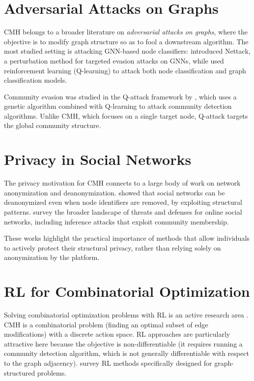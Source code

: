\documentclass[11pt,a4paper,twoside]{tesis}
\begin{document}
\section{Adversarial Attacks on Graphs}
\label{sec:adversarial}

CMH belongs to a broader literature on \emph{adversarial attacks on graphs}, where the
objective is to modify graph structure so as to fool a downstream algorithm. The most
studied setting is attacking GNN-based node classifiers: \textcite{zugner2018adversarial}
introduced Nettack, a perturbation method for targeted evasion attacks on GNNs, while
\textcite{dai2018adversarial} used reinforcement learning (Q-learning) to attack both
node classification and graph classification models.

Community evasion was studied in the Q-attack framework by \textcite{chen2019ga},
which uses a genetic algorithm combined with Q-learning to attack community detection
algorithms. Unlike CMH, which focuses on a single target node, Q-attack targets the
global community structure.

\section{Privacy in Social Networks}
\label{sec:privacy}

The privacy motivation for CMH connects to a large body of work on network anonymization
and deanonymization. \textcite{narayanan2009deanonymizing} showed that social networks
can be deanonymized even when node identifiers are removed, by exploiting structural
patterns. \textcite{Fire2014privacynetworks} survey the broader landscape of threats and
defenses for online social networks, including inference attacks that exploit community
membership.

These works highlight the practical importance of methods that allow individuals to
actively protect their structural privacy, rather than relying solely on anonymization by
the platform.

\section{RL for Combinatorial Optimization}
\label{sec:rl-combi}

Solving combinatorial optimization problems with RL is an active research area
\cite{mazyavkina2021rl}. CMH is a combinatorial problem (finding an optimal subset of
edge modifications) with a discrete action space. RL approaches are particularly
attractive here because the objective is non-differentiable (it requires running a
community detection algorithm, which is not generally differentiable with respect to
the graph adjacency). \textcite{tang2021rl_graphs} survey RL methods specifically
designed for graph-structured problems.
\end{document}
